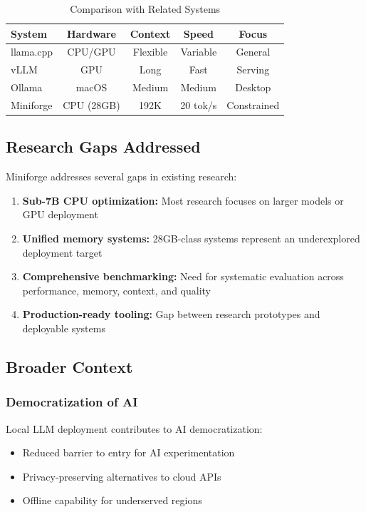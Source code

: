 \begin{table}[h]
\centering
\caption{Comparison with Related Systems}
\label{tab:related_comparison}
\begin{tabular}{lcccc}
\toprule
\textbf{System} & \textbf{Hardware} & \textbf{Context} & \textbf{Speed} & \textbf{Focus} \\
\midrule
llama.cpp & CPU/GPU & Flexible & Variable & General \\
vLLM & GPU & Long & Fast & Serving \\
Ollama & macOS & Medium & Medium & Desktop \\
Miniforge & CPU (28GB) & 192K & 20 tok/s & Constrained \\
\bottomrule
\end{tabular}
\end{table}

\subsection{Research Gaps Addressed}

Miniforge addresses several gaps in existing research:

\begin{enumerate}
    \item \textbf{Sub-7B CPU optimization:} Most research focuses on larger models or GPU deployment
    \item \textbf{Unified memory systems:} 28GB-class systems represent an underexplored deployment target
    \item \textbf{Comprehensive benchmarking:} Need for systematic evaluation across performance, memory, context, and quality
    \item \textbf{Production-ready tooling:} Gap between research prototypes and deployable systems
\end{enumerate}

\subsection{Broader Context}

\subsubsection{Democratization of AI}

Local LLM deployment contributes to AI democratization:

\begin{itemize}
    \item Reduced barrier to entry for AI experimentation
    \item Privacy-preserving alternatives to cloud APIs
    \item Offline capability for underserved regions
\end{itemize}

